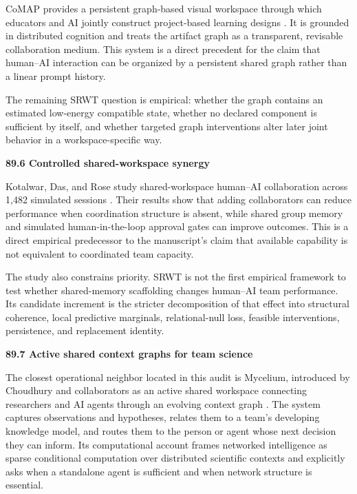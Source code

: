 \documentclass[11pt,letterpaper]{article}
\newcommand{\subtopic}[1]{%
 \vspace{0.45em}
 {\bfseries\color{AccentColor} #1\par}
}
\theoremstyle{plain}
\theoremstyle{definition}
\begin{document}
CoMAP provides a persistent graph-based visual workspace through which
educators and AI jointly construct project-based learning designs
\cite{LiJiang2026}. It is grounded in distributed cognition and treats the
artifact graph as a transparent, revisable collaboration medium. This system
is a direct precedent for the claim that human--AI interaction can be organized
by a persistent shared graph rather than a linear prompt history.

The remaining SRWT question is empirical: whether the graph contains an
estimated low-energy compatible state, whether no declared component is
sufficient by itself, and whether targeted graph interventions alter later
joint behavior in a workspace-specific way.

\subtopic{89.6 Controlled shared-workspace synergy}

Kotalwar, Das, and Rose study shared-workspace human--AI collaboration across
1,482 simulated sessions \cite{KotalwarDasRose2026}. Their results show that
adding collaborators can reduce performance when coordination structure is
absent, while shared group memory and simulated human-in-the-loop approval
gates can improve outcomes. This is a direct empirical predecessor to the
manuscript's claim that available capability is not equivalent to coordinated
team capacity.

The study also constrains priority. SRWT is not the first empirical framework
to test whether shared-memory scaffolding changes human--AI team performance.
Its candidate increment is the stricter decomposition of that effect into
structural coherence, local predictive marginals, relational-null loss,
feasible interventions, persistence, and replacement identity.

\subtopic{89.7 Active shared context graphs for team science}

The closest operational neighbor located in this audit is Mycelium, introduced
by Choudhury and collaborators as an active shared workspace connecting
researchers and AI agents through an evolving context graph
\cite{ChoudhuryEtAl2026}. The system captures observations and hypotheses,
relates them to a team's developing knowledge model, and routes them to the
person or agent whose next decision they can inform. Its computational account
frames networked intelligence as sparse conditional computation over
distributed scientific contexts and explicitly asks when a standalone agent is
sufficient and when network structure is essential.
\end{document}
